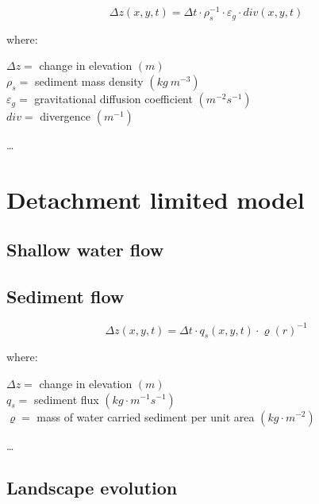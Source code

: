 \documentclass[final,3p,times,twocolumn]{elsarticle}
\begin{document}

\begin{equation}
\label{eq:grav_diffusion} 
{\Delta z(x,y,t) = \Delta t \cdot \rho_s^{-1} \cdot \varepsilon_g \cdot div(x,y,t)}
\end{equation}

\noindent
where: 

\noindent
$\Delta z =$ change in elevation $(m)$ \\
$\rho_s =$ sediment mass density $(kg ~m^{-3})$ \\
$\varepsilon_g =$ gravitational diffusion coefficient $(m^{-2} s^{-1})$ \\
$div =$ divergence $(m^{-1})$ \\
\vspace{1em}

\ldots
\cite{thaxton2004}


\section{Detachment limited model} \label{flux_model}
\subsection{Shallow water flow}
\subsection{Sediment flow}


\begin{equation}
\label{eq:flux_evolution} 
{\Delta z(x,y,t)} = \Delta t \cdot q_s(x,y,t) \cdot \varrho(r)^{-1}
\end{equation}

\noindent
where: 

\noindent
$\Delta z =$ change in elevation $(m)$ \\
$q_s =$ sediment flux $(kg \cdot m^{-1} s^{-1})$ \\
$\varrho =$ mass of water carried sediment per unit area $(kg \cdot m^{-2})$ \\
\vspace{1em}

\ldots
\cite{mitasova2013}

\subsection{Landscape evolution}
\end{document}

